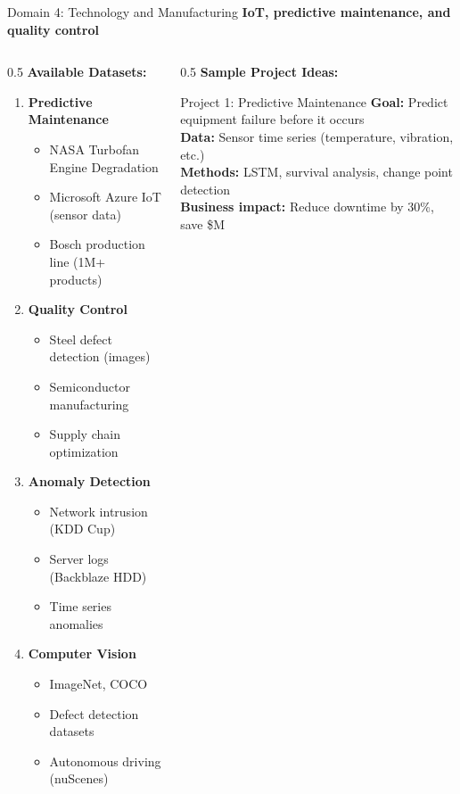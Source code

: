 \begin{frame}{Domain 4: Technology and Manufacturing}
\textbf{IoT, predictive maintenance, and quality control}

\begin{columns}
\begin{column}{0.5\textwidth}
\textbf{Available Datasets:}

\begin{enumerate}
\item \textbf{Predictive Maintenance}
   \begin{itemize}
   \item NASA Turbofan Engine Degradation
   \item Microsoft Azure IoT (sensor data)
   \item Bosch production line (1M+ products)
   \end{itemize}

\item \textbf{Quality Control}
   \begin{itemize}
   \item Steel defect detection (images)
   \item Semiconductor manufacturing
   \item Supply chain optimization
   \end{itemize}

\item \textbf{Anomaly Detection}
   \begin{itemize}
   \item Network intrusion (KDD Cup)
   \item Server logs (Backblaze HDD)
   \item Time series anomalies
   \end{itemize}

\item \textbf{Computer Vision}
   \begin{itemize}
   \item ImageNet, COCO
   \item Defect detection datasets
   \item Autonomous driving (nuScenes)
   \end{itemize}
\end{enumerate}
\end{column}

\begin{column}{0.5\textwidth}
\textbf{Sample Project Ideas:}

\begin{block}{Project 1: Predictive Maintenance}
\textbf{Goal:} Predict equipment failure before it occurs\\
\textbf{Data:} Sensor time series (temperature, vibration, etc.)\\
\textbf{Methods:} LSTM, survival analysis, change point detection\\
\textbf{Business impact:} Reduce downtime by 30\%, save \$M
\end{block}


\end{column}
\end{columns}
\end{frame}
